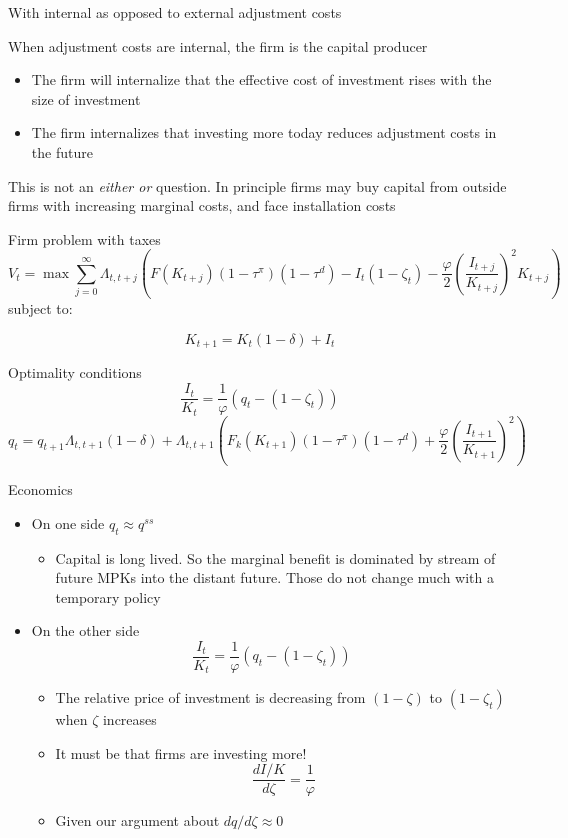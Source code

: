 \documentclass[11pt,aspectratio=169,xcolor={dvipsnames},hyperref={pdftex,pdfpagemode=UseNone,hidelinks,pdfdisplaydoctitle=true},usepdftitle=false]{beamer}
\begin{document}
\begin{frame}{With internal as opposed to external adjustment costs}

When adjustment costs are internal, the firm is the capital producer

\begin{itemize}
\item The firm will internalize that the effective cost of investment rises with the size of investment
\item The firm internalizes that investing more today reduces adjustment costs in the future
\end{itemize}
This is not an \textit{either or} question. In principle firms may buy capital from outside firms with increasing marginal costs, and face installation costs
\end{frame}

\begin{frame}{Firm problem with taxes}
\[V_t = \max \sum_{j = 0}^{\infty}\Lambda_{t,t+j} \left( F(K_{t+j})(1-\tau^{\pi})(1-\tau^d) - I_t(1-\zeta_t) - \frac{\varphi}{2}\left(\frac{I_{t+j}}{K_{t+j}}\right)^2 K_{t+j}\right)\]
subject to:

\[K_{t+1} = K_t(1-\delta) + I_t \]
\end{frame}

\begin{frame}{Optimality conditions}
\[\frac{I_t}{K_t} = \frac{1}{\varphi} (q_t - (1-\zeta_t)) \]
\[q_t = q_{t+1} \Lambda_{t,t+1} (1-\delta)  + \Lambda_{t,t+1} \left(F_k(K_{t+1})(1-\tau^{\pi})(1-\tau^d) + \frac{\varphi}{2}\left(\frac{I_{t+1}}{K_{t+1}}\right)^2 \right) \]
\end{frame}



\begin{frame}{Economics}
\begin{itemize}
\item On one side $q_t \approx q^{ss}$
\begin{itemize}
\item Capital is long lived. So the marginal benefit is dominated by stream of future MPKs into the distant future. Those do not change much with a temporary policy
\end{itemize}
\item On the other side \[\frac{I_t}{K_t} = \frac{1}{\varphi} (q_t - (1-\zeta_t)) \]
\begin{itemize}
\item The relative price of investment is decreasing from $(1-\zeta)$ to $(1-\zeta_t)$ when $\zeta$ increases
\item It must be that firms are investing more!
\[ \frac{d I/K}{d\zeta} = \frac{1}{\varphi}\]
\item Given our argument about $d q/d\zeta \approx 0$
\end{itemize}
\end{itemize}
\end{frame}
\end{document}
